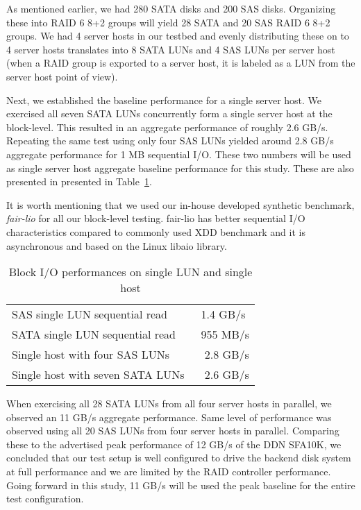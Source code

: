 As mentioned earlier, we had 280 SATA disks and 200 SAS disks. Organizing these
into RAID 6 8+2 groups will yield 28 SATA and 20 SAS RAID 6 8+2 groups. We had
4 server hosts in our testbed and evenly distributing these on to 4 server
hosts translates into 8 SATA LUNs and 4 SAS LUNs per server host (when a RAID
group is exported to a server host, it is labeled as a LUN from the server host
point of view).

Next, we established the baseline performance for a single server host. We
exercised all seven SATA LUNs concurrently form a single server host at the
block-level. This resulted in an aggregate performance of roughly 2.6 GB/s.
Repeating the same test using only four SAS LUNs yielded around 2.8 GB/s
aggregate performance for 1 MB sequential I/O. These two numbers will be used
as single server host aggregate baseline performance for this study. These are
also presented in presented in Table~\ref{tbl:block-io-baseline}. 

It is worth mentioning that we used our in-house developed synthetic benchmark,
\textit{fair-lio} for all our block-level testing.  fair-lio has better
sequential I/O characteristics compared to commonly used XDD benchmark and it
is asynchronous and based on the Linux libaio library.


\begin{table}[htb]
\centering
\caption{Block I/O performances on single LUN and single host}
\label{tbl:block-io-baseline}

\begin{tabular}{| l | l |}
    \hline
    SAS single LUN sequential read & ~1.4 GB/s \\
    SATA single LUN sequential read & ~955 MB/s \\
    Single host with four SAS LUNs & ~ 2.8 GB/s \\
    Single host with seven SATA LUNs & ~ 2.6 GB/s \\
    \hline
\end{tabular}
\end{table}

When exercising all 28 SATA LUNs from all four server hosts in parallel, we
observed an 11 GB/s aggregate performance. Same level of performance was
observed using all 20 SAS LUNs from four server hosts in parallel. Comparing
these to the advertised peak performance of 12 GB/s of the DDN SFA10K, we
concluded that our test setup is well configured to drive the backend disk
system at full performance and we are limited by the RAID controller
performance. Going forward in this study, 11 GB/s will be used the peak
baseline for the entire test configuration.


